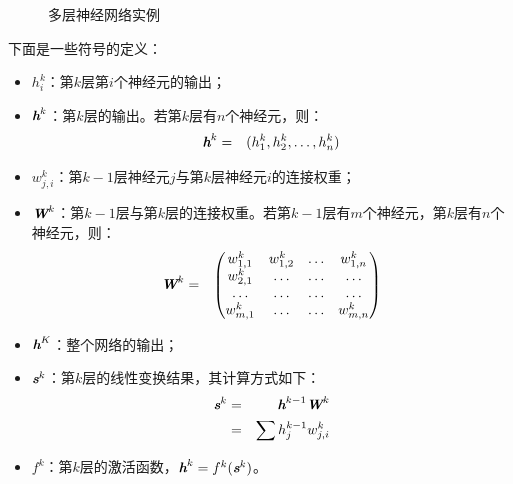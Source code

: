 \begin{figure}[htp]
\centering

\caption{多层神经网络实例}
\label{fig:9-52}
\end{figure}

\parinterval  下面是一些符号的定义：

\begin{itemize}
\vspace{0.5em}
\item  $ h_i^k $：第$ k $层第$ i $个神经元的输出；
\vspace{0.5em}
\item  $ {\textbf{\em h}}^k $：第$ k $层的输出。若第$ k $层有$ n $个神经元，则：
       \begin{eqnarray}
       {\textbf{\em h}}^k&=&(h_1^k,h_2^k,\dots,h_n^k)
       \end{eqnarray}
\vspace{0.5em}
\item  $ w_{j,i}^k $：第$ k-1 $层神经元$ j $与第$ k $层神经元$ i $的连接权重；
\vspace{0.5em}
\item  $ {\textbf{\em W}}^k $：第$ k-1 $层与第$ k $层的连接权重。若第$ k-1 $层有$ m $个神经元，第$ k $层有$ n $个神经元，则：
       \begin{eqnarray}
       {\textbf{\em W}}^k &=& \begin{pmatrix} w_{1,1}^k & w_{1,2}^k & \dots & w_{1,n}^k\\w_{2,1}^k & \dots & \dots & \dots\\ \dots & \dots & \dots & \dots\\w_{m,1}^k & \dots & \dots & w_{m,n}^k\end{pmatrix}
       \end{eqnarray}
\vspace{0.5em}
\item  $ {\textbf{\em h}}^K $：整个网络的输出；
\vspace{0.5em}
\item  $ {\textbf{\em s}}^k $：第$ k $层的线性变换结果，其计算方式如下：
       \begin{eqnarray}
       {\textbf{\em s}}^k & = & {\textbf{\em h}}^{k-1}{\textbf{\em W}}^k \nonumber \\
                   & = & \sum{h_j^{k-1}w_{j,i}^k}
       \label{eq:9-109}
       \end{eqnarray}
\vspace{0.5em}
\item  $ f^k $：第$ k $层的激活函数，$ {\textbf{\em h}}^k=f^k({\textbf{\em s}}^k)$。
\vspace{0.5em}
\end{itemize}


